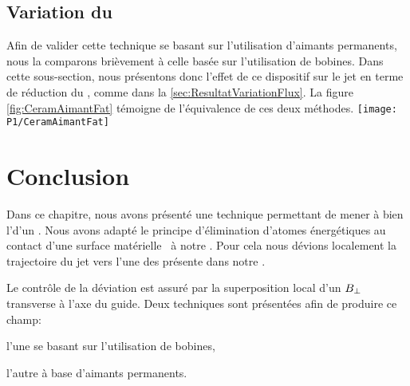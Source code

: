 
\casse

\subsection{Variation du \fat}\label{sec:ResultatVariationFluxAimants}
Afin de valider cette technique se basant sur l'utilisation d'aimants permanents, nous la comparons brièvement à celle basée sur l'utilisation de bobines. 
Dans cette sous-section, nous présentons donc l'effet de ce dispositif sur le jet en terme de réduction du \fat, comme dans la \autoref{sec:ResultatVariationFlux}. 
La figure \vref{fig:CeramAimantFat} témoigne de l'équivalence de ces deux méthodes.
\bfighs
\texttt{[image: P1/CeramAimantFat]}
\label{fig:CeramAimantFat}
\efigh

\RemonteUnPeuFig
\RemonteUnPeuFig

\section{Conclusion}
Dans ce chapitre, nous avons présenté une technique permettant de mener à bien l'\evap d'un \jatmg. Nous avons adapté le principe d'élimination d'atomes énergétiques au contact d'une surface matérielle~\cite{HMO03} à notre \setup. Pour cela nous dévions localement la trajectoire du jet vers l'une des \pdecs présente dans notre \gm. 

\noindent Le contrôle de la déviation est assuré par la superposition local d'un \chm ${B_{\rm \bot}}$ transverse à l'axe du guide. 
Deux techniques sont présentées afin de produire ce champ:
\begin{itemizel}
	\item l'une se basant sur l'utilisation de bobines, 
	\item l'autre à base d'aimants permanents.
\end{itemizel}



